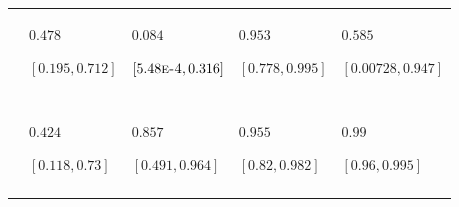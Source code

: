 \begin{table}
\begin{tabular}{>{\raggedleft\arraybackslash}m{1.2cm}>{\raggedright\arraybackslash}m{2.3cm}>{\raggedright\arraybackslash}m{2.3cm}>{\raggedright\arraybackslash}m{2.3cm}>{\raggedright\arraybackslash}m{2.3cm}}
\hspace{1em}\cellcolor{blue!5!white!90!black}{$\gamma_{L_{\infty}}$} & $0.478$\par $[0.195,0.712]$ & $0.084$\par $[5.48\text{\textsc{e-4}},0.316]$ & $0.953$\par $[0.778,0.995]$ & $0.585$\par $[0.00728,0.947]$\\
\addlinespace[0.3em]
\multicolumn{5}{l}{\cellcolor{blue!5!white!90!black}{\textbf{$\iota$-decomposition}}}\\
\hspace{1em}\cellcolor{blue!5!white!90!black}{$\iota_{L_{0}}$} & \cellcolor{gray}{$0.0413$\par $[0.0233,0.0806]$} & \cellcolor{gray}{$0.052$\par $[0.023,0.134]$} & \cellcolor{gray}{$0.00981$\par $[0.0052,0.0369]$} & \cellcolor{gray}{$0.0066$\par $[0.00363,0.0198]$}\\
\hspace{1em}\cellcolor{blue!5!white!90!black}{$\iota_{k}$} & $0.424$\par $[0.118,0.73]$ & $0.857$\par $[0.491,0.964]$ & $0.955$\par $[0.82,0.982]$ & $0.99$\par $[0.96,0.995]$\\
\hspace{1em}\cellcolor{blue!5!white!90!black}{$\iota_{L_{\infty}}$} & \cellcolor{gray}{$0.532$\par $[0.227,0.829]$} & \cellcolor{gray}{$0.0923$\par $[5.73\text{\textsc{e-4}},0.41]$} & \cellcolor{gray}{$0.0353$\par $[0.0102,0.144]$} & \cellcolor{gray}{$0.00351$\par $[1.85\text{\textsc{e-5}},0.0204]$}\\
\bottomrule
\end{tabular}
\end{table}